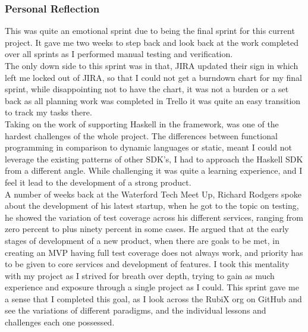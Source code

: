 \subsubsection{Personal Reflection}
This was quite an emotional sprint due to being the final sprint for this current project. It gave me two weeks to step back and look back at the work completed over all sprints as I performed manual testing and verification. 
\\The only down side to this sprint was in that, JIRA updated their sign in which left me locked out of JIRA, so that I could not get a burndown chart for my final sprint, while disappointing not to have the chart, it was not a burden or a set back as all planning work was completed in Trello it was quite an easy transition to track my tasks there. 
\\Taking on the work of supporting Haskell in the framework, was one of the hardest challenges of the whole project. The differences between functional programming in comparison to dynamic languages or static, meant I could not leverage the existing patterns of other SDK's, I had to approach the Haskell SDK from a different angle. While challenging it was quite a learning experience, and I feel it lead to the development of a strong product.
\\A number of weeks back at the Waterford Tech Meet Up, Richard Rodgers spoke about the development of his latest startup, when he got to the topic on testing, he showed the variation of test coverage across his different services, ranging from zero percent to plus ninety percent in some cases. He argued that at the early stages of development of a new product, when there are goals to be met, in creating an MVP having full test coverage does not always work, and priority has to be given to core services and development of features. I took this mentality with my project as I strived for breath over depth, trying to gain as much experience and exposure through a single project as I could. This sprint gave me a sense that I completed this goal, as I look across the RubiX org on GitHub and see the variations of different paradigms, and the individual lessons and challenges each one possessed.

